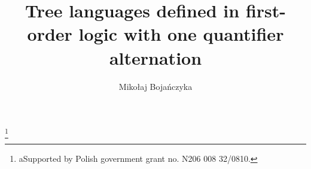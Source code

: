 \documentclass{LMCS}
\begin{document}
\newcommand{\hhl}[1]{\hl{#1}}

\newcommand{\debug}[1]{#1}

\addtolength\marginparwidth{2cm}
\newcommand{\luc}[1]{\debug{\marginpar{\tiny {\bf Luc}: #1}}}
\newcommand{\mikolaj}[1]{\debug{\marginpar{\tiny Mikolaj: #1}}}

\newcommand{\botcomp}{{H_\bot}}

\newcommand{\reorder}{\mathrm{reorder}}
\newcommand{\lgreensim}{\sim_{\mathcal L}}
\newcommand{\rgreensim}{\sim_{\mathcal R}}
\newcommand{\lex}{<_\mathrm{lex}}
\newcommand{\lexeq}{\leq_\mathrm{lex}}
\newcommand{\bigpiece}{\mathcal T}
\newcommand{\miff}{\mbox{iff}}
\newcommand{\pen}{n}
\newcommand{\hole}{\Box}
\newcommand{\ltrivial}{\mathcal L}
\newcommand{\rtrivial}{\mathcal R}

\newcommand{\rlogic}{\mathcal R}
\newcommand{\llogic}{\mathcal L}


\newcommand{\tlf}{\mathsf{F}}
\newcommand{\tle}{\mathsf E}
\newcommand{\tlu}{\mathsf U}
\newcommand{\tlex}{\mathsf{EX}}
\newcommand{\tlspider}[1]{\mathsf{E}^{#1}\mathsf{X}}
\newcommand{\tlef}{\mathsf{EF}p}
\newcommand{\tlleaf}{\mathsf{L}^{\downarrow}}
\newcommand{\tlfup}{\mathsf{F}^{\uparrow}}
\newcommand{\tlfh}{\mathsf{F}^{\rightarrow}}
\newcommand{\tlfhb}{\mathsf{F}^{\leftarrow}}
\newcommand{\tlag}{\mathsf{AG}}
\newcommand{\freef}[1]{#1^\Delta}
\newcommand{\tlsib}{\mathsf S}

\newcommand{\Stwo}{\ensuremath{\Sigma_2(<)}\xspace}
\newcommand{\Ptwo}{\ensuremath{\Pi_2(<)}\xspace}
\newcommand{\Dtwo}{\ensuremath{\Delta_2(<)}\xspace}
\newcommand{\Stwol}{\ensuremath{\Sigma_2(<,\lex)}\xspace}
\newcommand{\Ptwol}{\ensuremath{\Pi_2(<,\lex)}\xspace}
\newcommand{\Dtwol}{\ensuremath{\Delta_2(<,\lex)}\xspace}

\newcommand{\lgreen}{\le_\ltrivial}
\newcommand{\rgreen}{\le_\rtrivial}
\newcommand{\lgreeng}{\ge_\ltrivial}
\newcommand{\rgreeng}{\ge_\ltrivial}

\newcommand{\rsim}{\sim_{\rtrivial}}

\newcommand{\pieces}{\mathit{pieces}}
\newcommand{\subforest}{\leq}
\newcommand{\piece}{\preceq}
\newcommand{\pieceneq}{\prec}

\newcommand{\stab}{\mathit{stab}}
\newcommand{\sstab}{\mathit{sstab}}
\newcommand{\inter}{\Delta_2}

\newcommand{\mand}{\ \mbox{and}\ } \newcommand{\first}{\mathit{new}}

\title{Tree languages defined in first-order logic with one quantifier
alternation}
\author[M.~ Boja{\'n}czyk]{Miko{\l}aj Boja{\'n}czyk\rsuper a}	\address{{\lsuper a}Warsaw University}	  \thanks{{\lsuper a}Supported by Polish government grant
 no. N206 008 32/0810.}	
\end{document}
